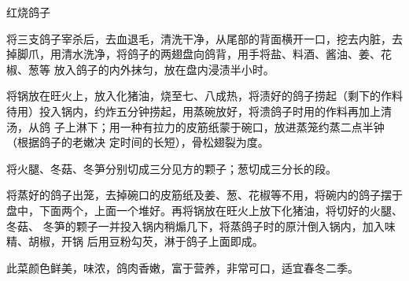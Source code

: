 \begin{recipe}{红烧鸽子}

\ingredients


\preparation

\step 将三支鸽子宰杀后，去血退毛，清洗干净，从尾部的背面横开一口，挖去内脏，去
掉脚爪，用清水洗净，将鸽子的两翅盘向鸽背，用手将盐、料酒、酱油、姜、花椒、葱等
放入鸽子的内外抹匀，放在盘内浸渍半小时。

\step 将锅放在旺火上，放入化猪油，烧至七、八成热，将渍好的鸽子捞起（剩下的作料
待用）投入锅内，约炸五分钟捞起，用蒸碗放好，将溃鸽子时用的作料再加上清汤，从鸽
子上淋下；用一种有拉力的皮筋纸蒙于碗口，放进蒸笼约蒸二点半钟（根据鸽子的老嫩决
定时间的长短），骨松翅裂为度。

\step 将火腿、冬菇、冬笋分别切成三分见方的颗子；葱切成三分长的段。

\step 将蒸好的鸽子出笼，去掉碗口的皮筋纸及姜、葱、花椒等不用，将碗内的鸽子摆于
盘中，下面两个，上面一个堆好。再将锅放在旺火上放下化猪油，将切好的火腿、冬菇、
冬笋的颗子一并投入锅内稍煽几下，将蒸鸽子时的原汁倒入锅内，加入味精、胡椒，开锅
后用豆粉勾芡，淋于鸽子上面即成。

\features

此菜颜色鲜美，味浓，鸽肉香嫩，富于营养，非常可口，适宜春冬二季。

\end{recipe}


